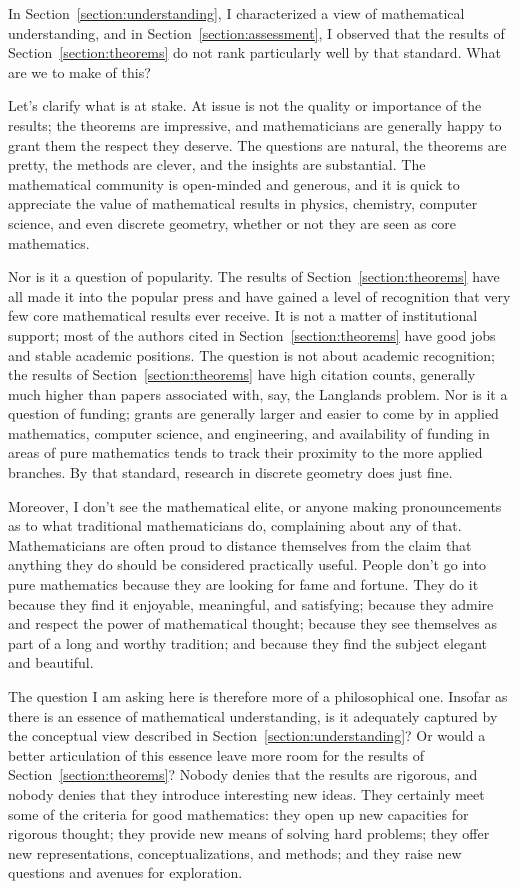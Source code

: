 \documentclass{amsart}
\theoremstyle{definition}
\theoremstyle{remark}
\numberwithin{equation}{section}
\begin{document}
In Section~\ref{section:understanding}, I characterized a view of mathematical understanding, and in Section~\ref{section:assessment}, I observed that the results of Section~\ref{section:theorems} do not rank particularly well by that standard. What are we to make of this?

Let's clarify what is at stake. At issue is not the quality or importance of the results; the theorems are impressive, and mathematicians are generally happy to grant them the respect they deserve. The questions are natural, the theorems are pretty, the methods are clever, and the insights are substantial. The mathematical community is open-minded and generous, and it is quick to appreciate the value of mathematical results in physics, chemistry, computer science, and even discrete geometry, whether or not they are seen as core mathematics.

Nor is it a question of popularity. The results of Section~\ref{section:theorems} have all made it into the popular press and have gained a level of recognition that very few core mathematical results ever receive. It is not a matter of institutional support; most of the authors cited in Section~\ref{section:theorems} have good jobs and stable academic positions. The question is not about academic recognition; the results of Section~\ref{section:theorems} have high citation counts, generally much higher than papers associated with, say, the Langlands problem. Nor is it a question of funding; grants are generally larger and easier to come by in applied mathematics, computer science, and engineering, and availability of funding in areas of pure mathematics tends to track their proximity to the more applied branches. By that standard, research in discrete geometry does just fine.

Moreover, I don't see the mathematical elite, or anyone making pronouncements as to what traditional mathematicians do, complaining about any of that. Mathematicians are often proud to distance themselves from the claim that anything they do should be considered practically useful. People don't go into pure mathematics because they are looking for fame and fortune. They do it because they find it enjoyable, meaningful, and satisfying; because they admire and respect the power of mathematical thought; because they see themselves as part of a long and worthy tradition; and because they find the subject elegant and beautiful.

The question I am asking here is therefore more of a philosophical one. Insofar as there is an essence of mathematical understanding, is it adequately captured by the conceptual view described in Section~\ref{section:understanding}? Or would a better articulation of this essence leave more room for the results of Section~\ref{section:theorems}? Nobody denies that the results are rigorous, and nobody denies that they introduce interesting new ideas. They certainly meet some of the criteria for good mathematics: they open up new capacities for rigorous thought; they provide new means of solving hard problems; they offer new representations, conceptualizations, and methods; and they raise new questions and avenues for exploration.
\end{document}
